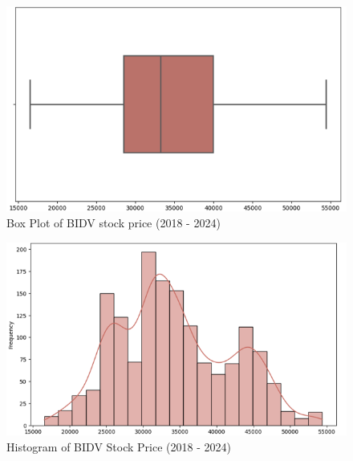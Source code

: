 \documentclass[conference]{IEEEtran}
\begin{document}
\begin{figure}[H]
  \centering
  \begin{minipage}{0.8\linewidth}
    \centering
        \includegraphics[width=\linewidth]{images/bidv_boxplot.png}
    \caption{Box Plot of BIDV stock price (2018 - 2024)}
    \label{fig1}
  \end{minipage}
\end{figure}

\begin{figure}[H]
    \centering
    \begin{minipage}{0.8\linewidth}
    \centering
        \includegraphics[width=\linewidth]{images/bidv_histogram.png}
    \caption{Histogram of BIDV Stock Price (2018 - 2024)}
    \label{fig2}
    \end{minipage}
\end{figure}
\end{document}
